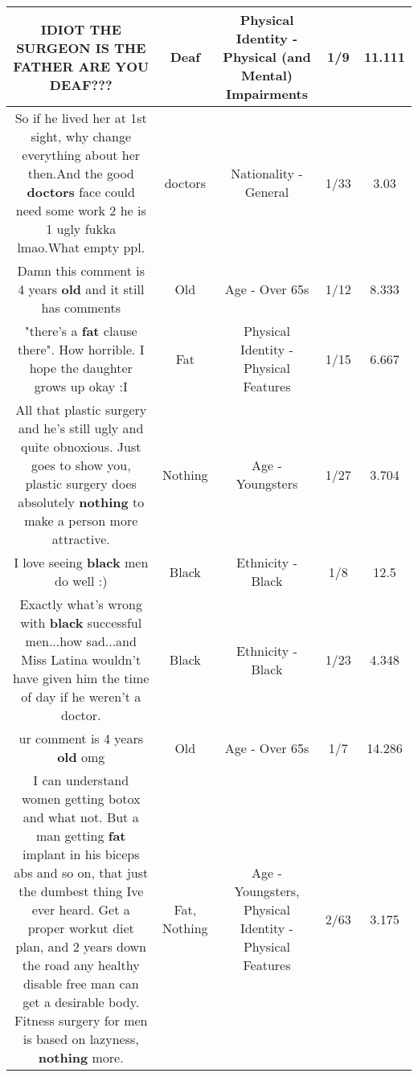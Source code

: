 \documentclass[11pt]{article}
\newlength\mylength
\begin{document}
\begin{center}
\begin{longtable}{|C{.65\mylength}|C{.30\mylength}|C{.12\mylength}|C{.12\mylength}|C{.12\mylength}|}
  \small IDIOT THE SURGEON IS THE FATHER ARE YOU \textbf{DEAF}???\normalsize   & Deaf & Physical Identity - Physical (and Mental) Impairments & 1/9 & 11.111 \\  \hline
  \small So if he lived her at 1st sight, why change everything about her then.And the good \textbf{doctors} face could need some work 2 he is 1 ugly fukka lmao.What empty ppl.\normalsize   & doctors & Nationality - General & 1/33 & 3.03 \\  \hline
  \small Damn this comment is 4 years \textbf{old} and it still has comments\normalsize   & Old & Age - Over 65s & 1/12 & 8.333 \\  \hline
  \small "there's a \textbf{fat} clause there". How horrible. I hope the daughter grows up okay :I\normalsize   & Fat & Physical Identity - Physical Features & 1/15 & 6.667 \\  \hline
  \small All that plastic surgery and he's still ugly and quite obnoxious. Just goes to show you, plastic surgery does absolutely \textbf{nothing} to make a person more attractive.\normalsize   & Nothing & Age - Youngsters & 1/27 & 3.704 \\  \hline
  \small I love seeing \textbf{black} men do well :)\normalsize   & Black & Ethnicity - Black & 1/8 & 12.5 \\  \hline
  \small Exactly what's wrong with \textbf{black} successful men...how sad...and Miss Latina wouldn't have given him the time of day if he weren't a doctor.\normalsize   & Black & Ethnicity - Black & 1/23 & 4.348 \\  \hline
  \small ur comment is 4 years \textbf{old} omg\normalsize   & Old & Age - Over 65s & 1/7 & 14.286 \\  \hline
  \small I can understand women getting botox and what not. But a man getting \textbf{fat} implant in his biceps abs and so on, that just the dumbest thing Ive ever heard. Get a proper workut  diet plan, and 2 years down the road any healthy disable free man can get a desirable body. Fitness surgery for men is based on lazyness, \textbf{nothing} more.\normalsize   & Fat, Nothing & Age - Youngsters, Physical Identity - Physical Features & 2/63 & 3.175 \\  \hline

\end{longtable}
\end{center}
\end{document}
